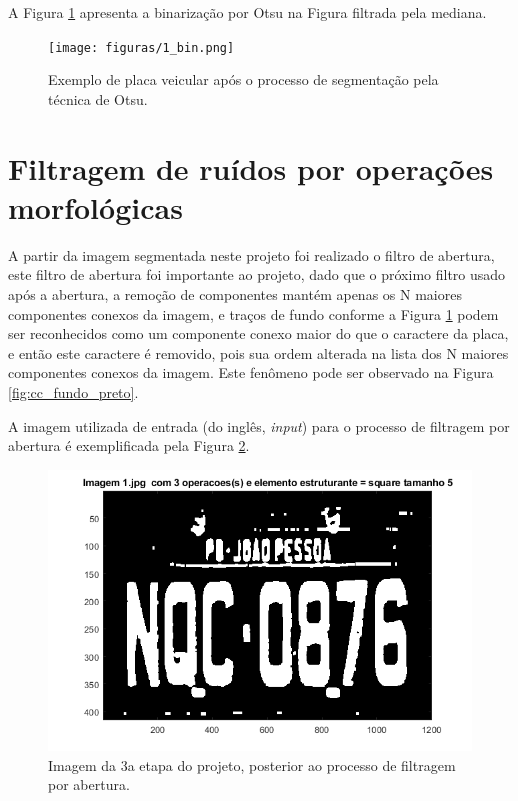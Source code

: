 \documentclass[
	12pt,				%
    oneside,			%
	a4paper,			%
	english,			%
	french,				%
	spanish,			%
	brazil,				%
	]{abntex2}
\begin{document}
A Figura \ref{fig:placa_segOtsu} apresenta a binarização por Otsu na Figura filtrada pela mediana.

\begin{figure}[!ht]
    \centering
    \texttt{[image: figuras/1\_bin.png]}
    \caption{Exemplo de placa veicular após o processo de segmentação pela técnica de Otsu.}
    \label{fig:placa_segOtsu}
\end{figure}

\section{Filtragem de ruídos por operações morfológicas}

A partir da imagem segmentada neste projeto foi realizado o filtro de abertura, este filtro de abertura foi importante ao projeto, dado que o próximo filtro usado após a abertura, a remoção de componentes mantém apenas os N maiores componentes conexos da imagem, e traços de fundo conforme a Figura \ref{fig:placa_segOtsu} podem ser reconhecidos como um componente conexo maior do que o caractere da placa, e então este caractere é removido, pois sua ordem alterada na lista dos N maiores componentes conexos da imagem. Este fenômeno pode ser observado na Figura \ref{fig:cc_fundo_preto}.

A imagem utilizada de entrada (do inglês, \textit{input}) para o processo de filtragem por abertura é exemplificada pela Figura \ref{fig:abertura_depois}.
\begin{figure}[!ht]
    \centering
    \includegraphics[scale=0.6]{etapas/etapa3.png}
    \caption{Imagem da 3a etapa do projeto, posterior ao processo de filtragem por abertura.}
    \label{fig:abertura_depois}
\end{figure}
\end{document}

